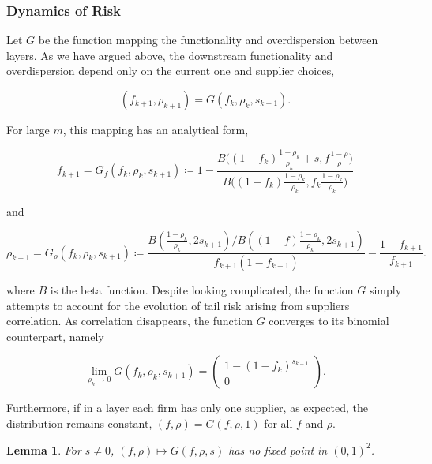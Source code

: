\documentclass[american, abstract=on]{scrartcl}
\theoremstyle{plain}
\newtheorem{lemma}{Lemma}
\begin{document}
\subsubsection{Dynamics of Risk}

Let $G$ be the function mapping the functionality and overdispersion between layers. As we have argued above, the downstream functionality and overdispersion depend only on the current one and supplier choices,

\begin{equation}
  (f_{k + 1}, \rho_{k + 1}) = G(f_k, \rho_k, s_{k + 1}).
\end{equation}

For large $m$, this mapping has an analytical form,

\begin{equation}
  f_{k + 1} = G_f(f_k, \rho_k, s_{k + 1}) \coloneqq 1 - \frac{B\Big( (1 - f_k) \frac{1 - \rho_k}{\rho_k} + s, f \frac{1 - \rho}{\rho} \Big)}{B\Big( (1 - f_k) \frac{1 - \rho_k}{\rho_k}, f_k \frac{1 - \rho_k}{\rho_k} \Big)}
\end{equation}

and

\begin{equation}
  \rho_{k + 1} = G_\rho(f_k, \rho_k, s_{k + 1}) \coloneqq \frac{ B\left(\frac{1 - \rho_k}{\rho_k}, 2s_{k + 1} \right) \Big/ B\left((1 - f) \frac{1 - \rho_k}{\rho_k}, 2s_{k + 1} \right)}{f_{k + 1} (1 - f_{k + 1})} - \frac{1 - f_{k + 1}}{f_{k + 1}}.
\end{equation}

where $B$ is the beta function. Despite looking complicated, the function $G$ simply attempts to account for the evolution of tail risk arising from suppliers correlation. As correlation disappears, the function $G$ converges to its binomial counterpart, namely

\begin{equation}
  \lim_{\rho_k \rightarrow 0} G(f_k, \rho_k, s_{k + 1}) = \begin{pmatrix}
    1 - (1 - f_k)^{s_{k + 1}} \\ 0
  \end{pmatrix}.
\end{equation}

Furthermore, if in a layer each firm has only one supplier, as expected, the distribution remains constant, $(f, \rho) = G(f, \rho, 1)$ for all $f$ and $\rho$.

\begin{lemma}
  For $s \neq 0$, $(f, \rho) \mapsto G(f, \rho, s)$ has no fixed point in $(0, 1)^2$.
\end{lemma}
\end{document}
